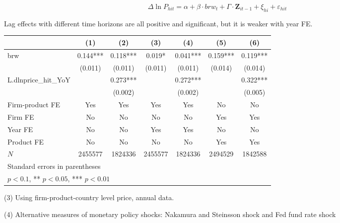 \documentclass[12pt]{article}
\begin{document}
\begin{equation}
    \Delta \ln P_{hit} = \alpha+\beta \cdot brw_{t}+ \Gamma \cdot \textbf{Z}_{it-1}+\xi_{hi}+\varepsilon_{hi t}
\end{equation}

Lag effects with different time horizons are all positive and significant, but it is weaker with year FE.


\begin{tabular}{l*{6}{c}}
\toprule
            &\multicolumn{1}{c}{(1)}   &\multicolumn{1}{c}{(2)}   &\multicolumn{1}{c}{(3)}   &\multicolumn{1}{c}{(4)}   &\multicolumn{1}{c}{(5)}   &\multicolumn{1}{c}{(6)}   \\
\midrule
brw         &       0.144***&       0.118***&       0.019*  &       0.041***&       0.159***&       0.119***\\
            &     (0.011)   &     (0.011)   &     (0.011)   &     (0.011)   &     (0.014)   &     (0.014)   \\
\addlinespace
L.dlnprice\_hit\_YoY&               &       0.273***&               &       0.272***&               &       0.322***\\
            &               &     (0.002)   &               &     (0.002)   &               &     (0.005)   \\
\addlinespace
Firm-product FE&         Yes   &         Yes   &         Yes   &         Yes   &          No   &          No   \\
\addlinespace
Firm FE     &          No   &          No   &          No   &          No   &         Yes   &         Yes   \\
\addlinespace
Year FE     &          No   &          No   &         Yes   &         Yes   &          No   &          No   \\
\addlinespace
Product FE  &          No   &          No   &          No   &          No   &         Yes   &         Yes   \\
\midrule
\(N\)       &     2455577   &     1824336   &     2455577   &     1824336   &     2494529   &     1842588   \\
\bottomrule
\multicolumn{7}{l}{\footnotesize Standard errors in parentheses}\\
\multicolumn{7}{l}{\footnotesize * \(p<0.1\), ** \(p<0.05\), *** \(p<0.01\)}\\
\end{tabular}

(3) Using firm-product-country level price, annual data.

(4) Alternative measures of monetary policy shocks: Nakamura and Steinsson shock and Fed fund rate shock
\end{document}
